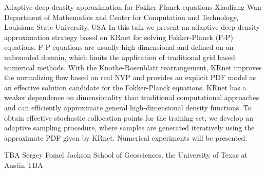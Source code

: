 \vspace{1.5ex}
\abs
{Adaptive deep density approximation for Fokker-Planck equations}
{Xiaoliang Wan}
{Department of Mathematics and Center for Computation and Technology, Louisiana State University, USA}
{	In this talk we present an adaptive deep density approximation strategy based on
	KRnet for solving Fokker-Planck (F-P) equations. F-P equations are usually high-dimensional 
	and defined on an unbounded domain, which limits the application of traditional grid based numerical methods. With the Knothe-Rosenblatt rearrangement, KRnet improves the normalizing flow 
	based on real NVP and provides an explicit PDF model as an effective solution candidate for
	the Fokker-Planck equations. KRnet has a weaker dependence on dimensionality than
	traditional computational approaches and can efficiently approximate general high-dimensional
	density functions. To obtain effective stochastic collocation points for the training set, we develop an adaptive sampling procedure, where samples are generated iteratively using the approximate PDF given by KRnet. Numerical experiments will be presented.}


\vspace{1.5ex}
\abs
{TBA}
{Sergey Fomel}
{Jackson School of Geosciences, the University of Texas at Austin}
{TBA}